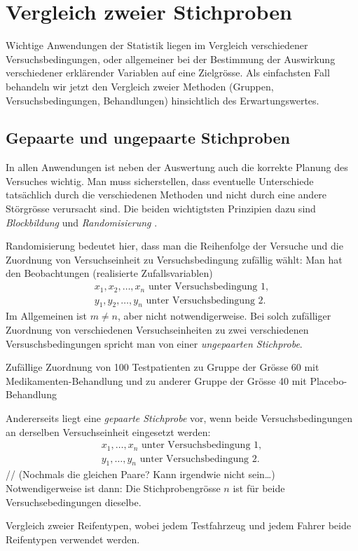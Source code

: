 \chapter{Vergleich zweier Stichproben}
\label{kap11}
Wichtige Anwendungen der Statistik liegen im Vergleich verschiedener Versuchsbedingungen, oder allgemeiner bei der Bestimmung der Auswirkung verschiedener erklärender Variablen auf eine Zielgrösse. Als einfachsten Fall behandeln wir jetzt den Vergleich zweier Methoden (Gruppen, Versuchsbedingungen, Behandlungen) hinsichtlich des Erwartungswertes.
\section{Gepaarte und ungepaarte Stichproben}
In allen Anwendungen ist neben der Auswertung auch die korrekte Planung des Versuches wichtig. Man muss sicherstellen, dass eventuelle Unterschiede tatsächlich durch die verschiedenen Methoden und nicht durch eine andere Störgrösse verursacht sind. Die beiden wichtigtsten Prinzipien dazu sind \emph{Blockbildung} und \emph{Randomisierung}
.

Randomisierung bedeutet hier, dass man die Reihenfolge der Versuche und die Zuordnung von Versuchseinheit zu Versuchsbedingung zufällig wählt: Man hat den Beobachtungen (realisierte Zufallsvariablen)
\begin{gather*}
	x_1,x_2,\ldots,x_n\text{ unter Versuchsbedingung 1},\\
	y_1,y_2,\ldots,y_n\text{ unter Versuchsbedingung 2}.
\end{gather*}
Im Allgemeinen ist $m\neq n$, aber nicht notwendigerweise. Bei solch zufälliger Zuordnung von verschiedenen Versuchseinheiten zu zwei verschiedenen Versuschsbedingungen spricht man von einer \emph{ungepaarten Stichprobe}.
\begin{bspl}
	Zufällige Zuordnung von 100 Testpatienten zu Gruppe der Grösse 60 mit Medikamenten-Behandlung und zu anderer Gruppe der Grösse 40 mit Placebo-Behandlung
\end{bspl}
Andererseits liegt eine \emph{gepaarte Stichprobe} vor, wenn beide Versuchsbedingungen an derselben Versuchseinheit eingesetzt werden:
\begin{gather*}
	x_1,\ldots,x_n\text{ unter Versuchsbedingung 1},\\
	y_1,\ldots,y_n\text{ unter Versuchsbedingung 2}.
\end{gather*}
// (Nochmals die gleichen Paare? Kann irgendwie nicht sein\ldots) \\
Notwendigerweise ist dann: Die Stichprobengrösse $n$ ist für beide Versuchsebedingungen dieselbe.
\begin{bspl}
	Vergleich zweier Reifentypen, wobei jedem Testfahrzeug und jedem Fahrer beide Reifentypen verwendet werden.
\end{bspl}
